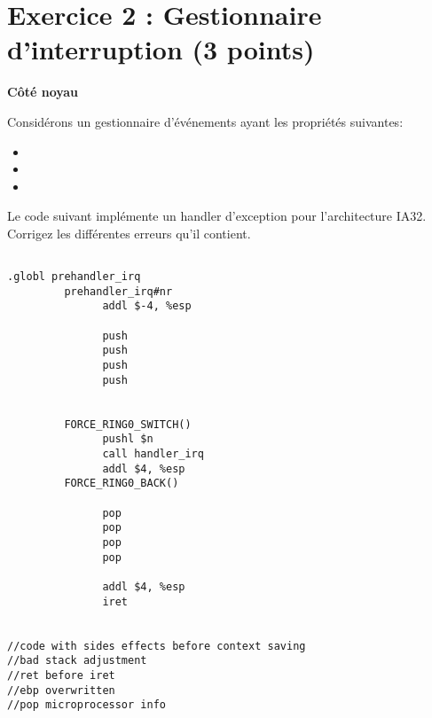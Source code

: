 \section*{Exercice 2 : Gestionnaire d'interruption (3 points)}

{\bf C\^ot\'e noyau}

Consid\'erons un gestionnaire d'\'ev\'enements ayant les propri\'et\'es suivantes:

\begin{itemize}
\item
\item
\item
\end{itemize}

Le code suivant impl\'emente un handler d'exception pour l'architecture IA32. Corrigez les diff\'erentes erreurs qu'il contient.

\begin{verbatim}

.globl prehandler_irq
         prehandler_irq#nr
               addl $-4, %esp

               push
               push
               push
               push


         FORCE_RING0_SWITCH()
               pushl $n
               call handler_irq
               addl $4, %esp
         FORCE_RING0_BACK()

               pop
               pop
               pop
               pop

               addl $4, %esp
               iret


//code with sides effects before context saving
//bad stack adjustment
//ret before iret
//ebp overwritten
//pop microprocessor info

\end{verbatim}

